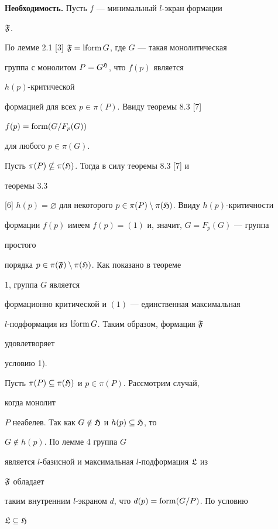 \begin{pf} 


{\bf Необходимость.} Пусть $f$ --- минимальный $l$-экран формации 


$\frak F$. 


По лемме 2.1 [3] $\frak F=\operatorname{lform} G$, где $G$ --- такая монолитическая 


группа с монолитом $P=G^{\frak H}$, что $f(p)$ является 


$h(p)$-критической 


формацией для всех $p\in\pi(P)$. Ввиду теоремы 8.3 [7] 


$f(p)=\operatorname{form}(G/F_p(G))$ 


для любого $p\in\pi(G)$. 


 


Пусть $\pi(P)\nsubseteq\pi(\frak H)$. Тогда в силу теоремы 8.3 [7] и 


теоремы 3.3 


[6] $h(p)=\varnothing$ для некоторого $p\in\pi(P)\setminus\pi(\frak 


H)$. Ввиду $h(p)$-критичности 


формации $f(p)$ имеем $f(p)=(1)$ и, значит, $G=F_p(G)$ --- группа 


простого 


порядка $p\in\pi(\frak F)\setminus\pi(\frak H)$. Как показано в теореме 


1, группа $G$ является 


формационно критической и $(1)$ --- единственная максимальная 


$l$-подформация из $\operatorname{lform} G$. Таким образом, формация $\frak F$ 


удовлетворяет 


условию 1). 


 


Пусть $\pi(P)\subseteq\pi(\frak H)$ и $p\in\pi(P)$. Рассмотрим случай, 


когда монолит 


$P$ неабелев. Так как $G\notin\frak H$ и $h(p)\subseteq\frak H$, то 


$G\notin h(p)$. По лемме 4 группа $G$ 


является $l$-базисной и максимальная $l$-подформация $\frak L$ из 


$\frak F$ обладает 


таким внутренним $l$-экраном $d$, что $d(p)=\operatorname{form}(G/P)$. По условию 


$\frak L\subseteq\frak H$ 



\end{pf}
